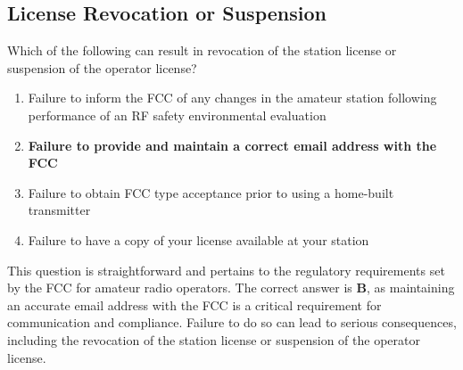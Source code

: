 \subsection{License Revocation or Suspension}
\label{T1C07}

\begin{tcolorbox}[colback=gray!10!white,colframe=black!75!black,title=T1C07]
Which of the following can result in revocation of the station license or suspension of the operator license?
\begin{enumerate}[label=\Alph*),noitemsep]
    \item Failure to inform the FCC of any changes in the amateur station following performance of an RF safety environmental evaluation
    \item \textbf{Failure to provide and maintain a correct email address with the FCC}
    \item Failure to obtain FCC type acceptance prior to using a home-built transmitter
    \item Failure to have a copy of your license available at your station
\end{enumerate}
\end{tcolorbox}

This question is straightforward and pertains to the regulatory requirements set by the FCC for amateur radio operators. The correct answer is \textbf{B}, as maintaining an accurate email address with the FCC is a critical requirement for communication and compliance. Failure to do so can lead to serious consequences, including the revocation of the station license or suspension of the operator license.